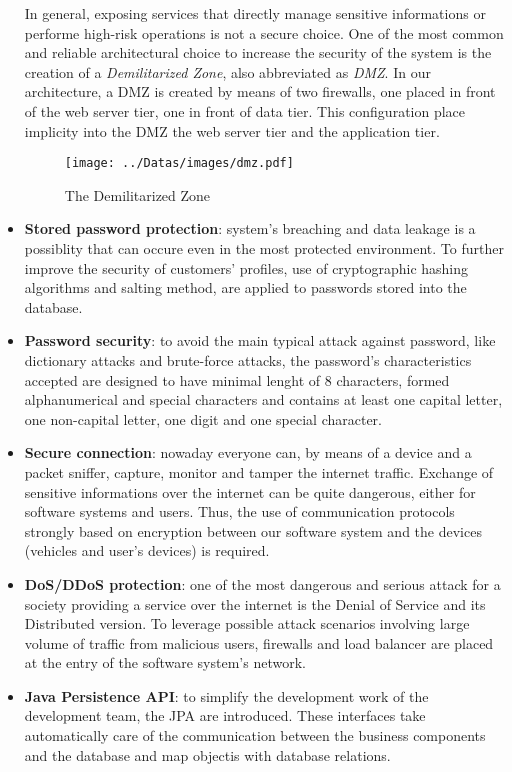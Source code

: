 \begin{itemize}
In general, exposing services that directly manage sensitive informations or performe high-risk operations is not a secure choice. One of the most common and reliable architectural choice to increase the security of the system is the creation of a \textit{Demilitarized Zone}, also abbreviated as \textit{DMZ}. In our architecture, a DMZ is created by means of two firewalls, one placed in front of the web server tier, one in front of data tier. This configuration place implicity into the DMZ the web server tier and the application tier.
\begin{figure}[H]
	\centerline{
		\texttt{[image: ../Datas/images/dmz.pdf]}
	}
	\caption{The Demilitarized Zone}
	\label{fig:dmz}
\end{figure}
	\item \textbf{Stored password protection}: system's breaching and data leakage is a possiblity that can occure even in the most protected environment. To further improve the security of customers' profiles, use of cryptographic hashing algorithms and salting method, are applied to passwords stored into the database.
	\item \textbf{Password security}: to avoid the main typical attack against password, like dictionary attacks and brute-force attacks, the password's characteristics accepted are designed to have minimal lenght of 8 characters, formed alphanumerical and special characters and contains at least one capital letter, one non-capital letter, one digit and one special character.
	\item \textbf{Secure connection}: nowaday everyone can, by means of a device and a packet sniffer, capture, monitor and tamper the internet traffic. Exchange of sensitive informations over the internet can be quite dangerous, either for software systems and users. Thus, the use of communication protocols strongly based on encryption between our software system and the devices (vehicles and user's devices) is required.
	\item \textbf{DoS/DDoS protection}: one of the most dangerous and serious attack for a society providing a service over the internet is the Denial of Service and its Distributed version. To leverage possible attack scenarios involving large volume of traffic from malicious users, firewalls and load balancer are placed at the entry of the software system's network.
	\item \textbf{Java Persistence API}: to simplify the development work of the development team, the JPA are introduced. These interfaces take automatically care of the communication between the business components and the database and map objectis with database relations.
\end{itemize}
